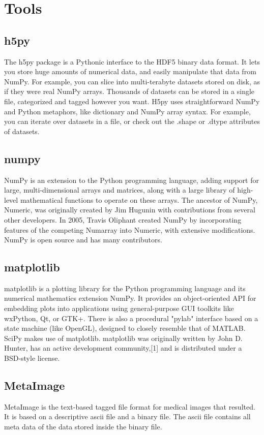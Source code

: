 \section{Tools}

\subsection{h5py}
\label{sec:h5py}
The h5py package is a Pythonic interface to the HDF5 binary data format.
It lets you store huge amounts of numerical data, and easily manipulate that data from NumPy. For example, you can slice into multi-terabyte datasets stored on disk, as if they were real NumPy arrays. Thousands of datasets can be stored in a single file, categorized and tagged however you want.
H5py uses straightforward NumPy and Python metaphors, like dictionary and NumPy array syntax. For example, you can iterate over datasets in a file, or check out the .shape or .dtype attributes of datasets. \cite{h5py}
\subsection{numpy}
\label{sec:numpy}
NumPy is an extension to the Python programming language, adding support for large, multi-dimensional arrays and matrices, along with a large library of high-level mathematical functions to operate on these arrays. The ancestor of NumPy, Numeric, was originally created by Jim Hugunin with contributions from several other developers. In 2005, Travis Oliphant created NumPy by incorporating features of the competing Numarray into Numeric, with extensive modifications. NumPy is open source and has many contributors. \cite{numpy}
\subsection{matplotlib}
\label{sec:matplotlib}
matplotlib is a plotting library for the Python programming language and its numerical mathematics extension NumPy. It provides an object-oriented API for embedding plots into applications using general-purpose GUI toolkits like wxPython, Qt, or GTK+. There is also a procedural "pylab" interface based on a state machine (like OpenGL), designed to closely resemble that of MATLAB. SciPy makes use of matplotlib.
matplotlib was originally written by John D. Hunter, has an active development community,[1] and is distributed under a BSD-style license. \cite{matplotlib}
\subsection{MetaImage}
\label{sec:MetaImage}
MetaImage is the text-based tagged file format for medical images that resulted. \cite{metaimage}
It is based on a descriptive ascii file and a binary file.
The ascii file contains all meta data of the data stored inside the binary file.

